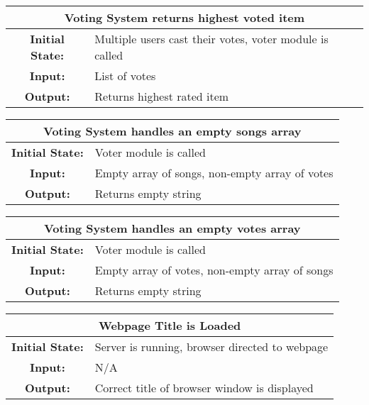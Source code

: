 \documentclass[12pt, titlepage]{article}
\begin{document}
\begin{center}
\begin{table}[H]
\begin{tabularx}{\textwidth}{| c X |}
\hline
\multicolumn{2}{|c|}{\textbf{Voting System returns highest voted item}}\\
\hline
\textbf{Initial State: } & Multiple users cast their votes, voter module is called\\
\textbf{Input: } & List of votes\\
\textbf{Output: } & Returns highest rated item\\
\hline
\end{tabularx}
\end{table}
\end{center}


\begin{center}
\begin{table}[H]
\begin{tabularx}{\textwidth}{| c X |}
\hline
\multicolumn{2}{|c|}{\textbf{Voting System handles an empty songs array}}\\
\hline
\textbf{Initial State: } & Voter module is called\\
\textbf{Input: } & Empty array of songs, non-empty array of votes\\
\textbf{Output: } & Returns empty string\\
\hline
\end{tabularx}
\end{table}
\end{center}


\begin{center}
\begin{table}[H]
\begin{tabularx}{\textwidth}{| c X |}
\hline
\multicolumn{2}{|c|}{\textbf{Voting System handles an empty votes array}}\\
\hline
\textbf{Initial State: } & Voter module is called\\
\textbf{Input: } & Empty array of votes, non-empty array of songs\\
\textbf{Output: } & Returns empty string\\
\hline
\end{tabularx}
\end{table}
\end{center}


\begin{center}
\begin{table}[H]
\begin{tabularx}{\textwidth}{| c X |}
\hline
\multicolumn{2}{|c|}{\textbf{Webpage Title is Loaded}}\\
\hline
\textbf{Initial State: } & Server is running, browser directed to webpage\\
\textbf{Input: } & N/A\\
\textbf{Output: } & Correct title of browser window is displayed\\
\hline
\end{tabularx}
\end{table}
\end{center}
\end{document}
